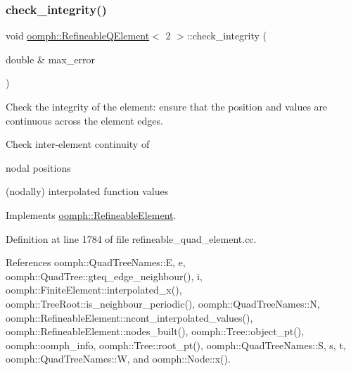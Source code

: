\subsubsection{\texorpdfstring{check\+\_\+integrity()}{check\_integrity()}}
{\footnotesize\ttfamily void \hyperlink{classoomph_1_1RefineableQElement}{oomph\+::\+Refineable\+Q\+Element}$<$ 2 $>$\+::check\+\_\+integrity (\begin{DoxyParamCaption}\item[{double \&}]{max\+\_\+error }\end{DoxyParamCaption})\hspace{0.3cm}{\ttfamily [virtual]}}



Check the integrity of the element\+: ensure that the position and values are continuous across the element edges. 

Check inter-\/element continuity of
\begin{DoxyItemize}
\item nodal positions
\item (nodally) interpolated function values 
\end{DoxyItemize}

Implements \hyperlink{classoomph_1_1RefineableElement_ae665f2d2eb0b6410ddcb101caa80922a}{oomph\+::\+Refineable\+Element}.



Definition at line 1784 of file refineable\+\_\+quad\+\_\+element.\+cc.



References oomph\+::\+Quad\+Tree\+Names\+::E, e, oomph\+::\+Quad\+Tree\+::gteq\+\_\+edge\+\_\+neighbour(), i, oomph\+::\+Finite\+Element\+::interpolated\+\_\+x(), oomph\+::\+Tree\+Root\+::is\+\_\+neighbour\+\_\+periodic(), oomph\+::\+Quad\+Tree\+Names\+::N, oomph\+::\+Refineable\+Element\+::ncont\+\_\+interpolated\+\_\+values(), oomph\+::\+Refineable\+Element\+::nodes\+\_\+built(), oomph\+::\+Tree\+::object\+\_\+pt(), oomph\+::oomph\+\_\+info, oomph\+::\+Tree\+::root\+\_\+pt(), oomph\+::\+Quad\+Tree\+Names\+::S, s, t, oomph\+::\+Quad\+Tree\+Names\+::W, and oomph\+::\+Node\+::x().

\mbox{\label{classoomph_1_1RefineableQElement_3_012_01_4_a01e1eb063dd2c98ebb42d87959ca6b88}} 
